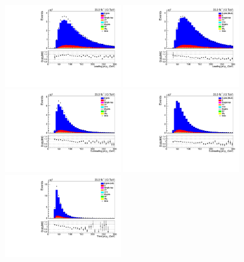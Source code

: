 \begin{figure}[!hp]
\centering
\includegraphics[width=0.45\textwidth]{figs/background-estimation/plots/unblinded/DY_control_old_prompt_ee_ttbarInc/leadingJetPt_SingleTop_jetSel_ee.pdf}
\includegraphics[width=0.45\textwidth]{figs/background-estimation/plots/unblinded/DY_control_old_prompt_ee_DYamcatnlo/leadingJetPt_SingleTop_jetSel_ee.pdf}
\\
\includegraphics[width=0.45\textwidth]{figs/background-estimation/plots/unblinded/DY_control_old_prompt_ee_ttbarInc/secondJetPt_SingleTop_jetSel_ee.pdf}
\includegraphics[width=0.45\textwidth]{figs/background-estimation/plots/unblinded/DY_control_old_prompt_ee_DYamcatnlo/secondJetPt_SingleTop_jetSel_ee.pdf}
\\
\includegraphics[width=0.45\textwidth]{figs/background-estimation/plots/unblinded/DY_control_old_prompt_ee_ttbarInc/thirdJetPt_SingleTop_jetSel_ee.pdf}

\end{figure}
